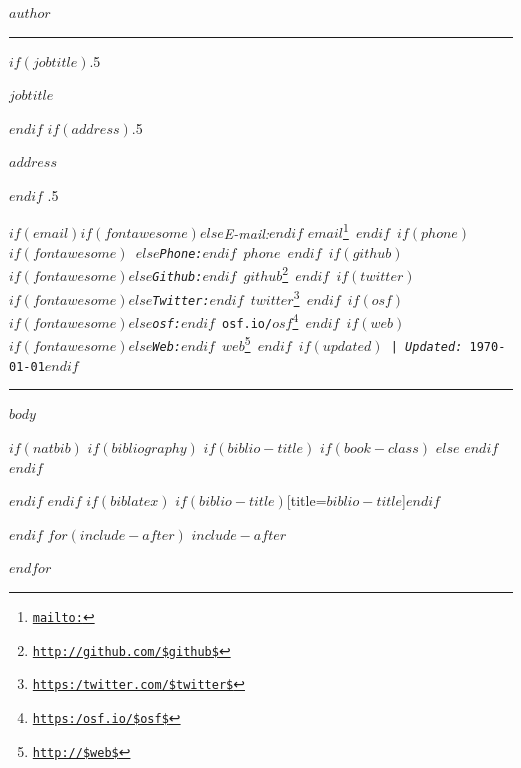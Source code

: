 \documentclass[$if(fontsize)$$fontsize$,$endif$$if(lang)$$babel-lang$,$endif$$if(papersize)$$papersize$paper,$endif$$for(classoption)$$classoption$$sep$,$endfor$]{$documentclass$}
\renewcommand{\href}[2]{#2\footnote{\url{#1}}}
\begin{document}
\centerline{\huge \bf $author$}

\vspace{2 mm}

\hrule

\vspace{2 mm}

$if(jobtitle)$\moveleft.5\hoffset\centerline{$jobtitle$}$endif$
$if(address)$\moveleft.5\hoffset\centerline{$address$}$endif$
\moveleft.5\hoffset\centerline{ $if(email)$$if(fontawesome)$\faEnvelopeO \hspace{1 mm}$else$\emph{E-mail:}$endif$ \href{mailto:}{\tt $email$} \hspace{1 mm}$endif$ $if(phone)$$if(fontawesome)$ \faPhone \hspace{1 mm}$else$\emph{Phone:}$endif$  $phone$  \hspace{1 mm} $endif$ $if(github)$$if(fontawesome)$\faGithub \hspace{1 mm}$else$\emph{Github:}$endif$ \href{http://github.com/$github$}{\tt $github$} \hspace{1 mm} $endif$  $if(twitter)$$if(fontawesome)$\faTwitter \hspace{1 mm}$else$\emph{Twitter:}$endif$ \href{https:/twitter.com/$twitter$}{\tt $twitter$} \hspace{1 mm} $endif$ $if(osf)$$if(fontawesome)$\faUnlock \hspace{1 mm}$else$\emph{osf:}$endif$ \href{https:/osf.io/$osf$}{\tt osf.io/$osf$} \hspace{1 mm} $endif$ $if(web)$$if(fontawesome)$\faGlobe \hspace{1 mm}$else$\emph{Web:}$endif$ \href{http://$web$}{\tt $web$}  $endif$ $if(updated)$ | \emph{Updated:} \apstylekinda\today$endif$} 

\vspace{2 mm}

\hrule


$body$

$if(natbib)$
$if(bibliography)$
$if(biblio-title)$
$if(book-class)$
\renewcommand\bibname{$biblio-title$}
$else$
\renewcommand\refname{$biblio-title$}
$endif$
$endif$


$endif$
$endif$
$if(biblatex)$
\printbibliography$if(biblio-title)$[title=$biblio-title$]$endif$

$endif$
$for(include-after)$
$include-after$

$endfor$
\end{document}
